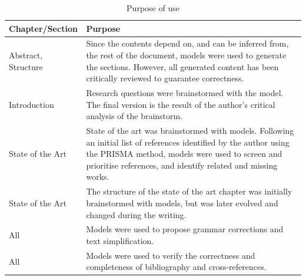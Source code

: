 \begin{table}[htbp]
  \centering
  \caption{Purpose of use}
  \label{tab:ai-purpose}
  \begin{tabularx}{\textwidth}{l X}
    \toprule
    Chapter/Section     & Purpose                                                                                                                                                                                                          \\
    \midrule
    Abstract, Structure &
    Since the contents depend on, and can be inferred from, the rest of the document, models were used to generate the sections. However, all generated content has been critically reviewed to guarantee correctness.                     \\

    Introduction        &
    Research questions were brainstormed with the model. The final version is the result of the author's critical analysis of the brainstorm.                                                                                              \\

    State of the Art    &
    State of the art was brainstormed with models. Following an initial list of references identified by the author using the PRISMA method, models were used to screen and prioritise references, and identify related and missing works. \\

    State of the Art    &
    The structure of the state of the art chapter was initially brainstormed with models, but was later evolved and changed during the writing.                                                                                            \\

    All                 &
    Models were used to propose grammar corrections and text simplification.                                                                                                                                                               \\

    All                 &
    Models were used to verify the correctness and completeness of bibliography and cross-references.                                                                                                                                      \\
    \bottomrule
  \end{tabularx}
\end{table}

